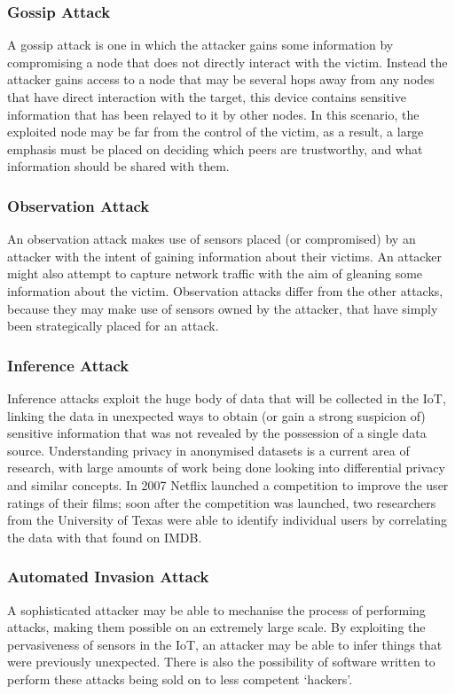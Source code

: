 \documentclass[10pt,journal,compsoc]{IEEEtran}
\begin{document}
\subsubsection{Gossip Attack}
A gossip attack is one in which the attacker gains some information by
compromising a node that does not directly interact with the victim. Instead
the attacker gains access to a node that may be several hops away from any
nodes that have direct interaction with the target, this device contains
sensitive information that has been relayed to it by other nodes. In this
scenario, the exploited node may be far from the control of the victim, as a
result, a large emphasis must be placed on deciding which peers are
trustworthy, and what information should be shared with them.

\subsubsection{Observation Attack}
An observation attack makes use of sensors placed (or compromised) by an
attacker with the intent of gaining information about their victims. An
attacker might also attempt to capture network traffic with the aim of gleaning
some information about the victim. Observation attacks differ from the other
attacks, because they may make use of sensors owned by the attacker, that have
simply been strategically placed for an attack. 

\subsubsection{Inference Attack}
Inference attacks exploit the huge body of data that will be collected in the
IoT, linking the data in unexpected ways to obtain (or gain a strong suspicion
of) sensitive information that was not revealed by the possession of a single
data source. Understanding privacy in anonymised datasets is a current area of
research, with large amounts of work being done looking into differential privacy
and similar concepts. In 2007 Netflix launched a competition to improve the
user ratings of their films; soon after the competition was launched, two
researchers from the University of Texas were able to identify individual users
by correlating the data with that found on IMDB\cite{Narayanan2008}.

\subsubsection{Automated Invasion Attack}
A sophisticated attacker may be able to mechanise the process of performing
attacks, making them possible on an extremely large scale. By exploiting the
pervasiveness of sensors in the IoT, an attacker may be able to infer things
that were previously unexpected. There is also the possibility of software
written to perform these attacks being sold on to less competent `hackers'. 
\end{document}
